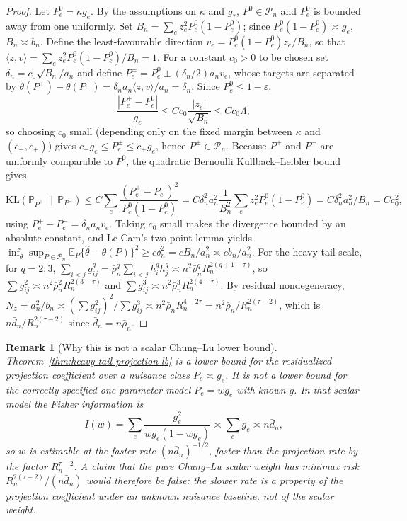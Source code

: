 \documentclass[12pt]{article}
\newtheorem{remark}{Remark}
\newcommand{\1}{\mathbf{1}}
\begin{document}
\begin{proof}
Let $P^0_e=\kappa g_e$. By the assumptions on $\kappa$ and $g_*$, $P^0\in\mathcal P_n$ and $P^0_e$ is
bounded away from one uniformly. Set $B_n=\sum_e z_e^2 P^0_e(1-P^0_e)$; since $P^0_e(1-P^0_e)\asymp g_e$,
$B_n\asymp b_n$. Define the least-favourable direction $v_e=P^0_e(1-P^0_e)z_e/B_n$, so that
$\langle z,v\rangle=\sum_e z_e^2 P^0_e(1-P^0_e)/B_n=1$. For a constant $c_0>0$ to be chosen set
$\delta_n=c_0\sqrt{B_n}/a_n$ and define $P^\pm_e=P^0_e\pm(\delta_n/2)a_n v_e$, whose targets are separated
by $\theta(P^+)-\theta(P^-)=\delta_n a_n\langle z,v\rangle/a_n=\delta_n$. Since $P^0_e\le 1-\varepsilon$,
\[
    \frac{|P^\pm_e-P^0_e|}{g_e}\le Cc_0\frac{|z_e|}{\sqrt{B_n}}\le Cc_0\Lambda,
\]
so choosing $c_0$ small (depending only on the fixed margin between $\kappa$ and $(c_-,c_+)$) gives
$c_-g_e\le P^\pm_e\le c_+g_e$, hence $P^\pm\in\mathcal P_n$. Because $P^+$ and $P^-$ are uniformly
comparable to $P^0$, the quadratic Bernoulli Kullback--Leibler bound gives
\[
    \mathrm{KL}(\mathbb P_{P^+}\,\|\,\mathbb P_{P^-})\le C\sum_e\frac{(P^+_e-P^-_e)^2}{P^0_e(1-P^0_e)}
    =C\delta_n^2 a_n^2\frac{1}{B_n^2}\sum_e z_e^2 P^0_e(1-P^0_e)=C\delta_n^2 a_n^2/B_n=Cc_0^2,
\]
using $P^+_e-P^-_e=\delta_n a_n v_e$. Taking $c_0$ small makes the divergence bounded by an absolute
constant, and Le Cam's two-point lemma yields
$\inf_{\widehat\theta}\sup_{P\in\mathcal P_n}\mathbb E_P\{\widehat\theta-\theta(P)\}^2\ge c\delta_n^2
=cB_n/a_n^2\asymp cb_n/a_n^2$. For the heavy-tail scale, for $q=2,3$,
$\sum_{i<j}g_{ij}^q=\bar\rho_n^q\sum_{i<j}h_i^q h_j^q\asymp n^2\bar\rho_n^q R_n^{2(q+1-\tau)}$, so
$\sum g_{ij}^2\asymp n^2\bar\rho_n^2 R_n^{2(3-\tau)}$ and $\sum g_{ij}^3\asymp n^2\bar\rho_n^3
R_n^{2(4-\tau)}$. By residual nondegeneracy,
$N_z=a_n^2/b_n\asymp(\sum g_{ij}^2)^2/\sum g_{ij}^3\asymp n^2\bar\rho_n R_n^{4-2\tau}
=n^2\bar\rho_n/R_n^{2(\tau-2)}$, which is $n\bar d_n/R_n^{2(\tau-2)}$ since $\bar d_n=n\bar\rho_n$.
\end{proof}

\begin{remark}[Why this is not a scalar Chung--Lu lower bound]
Theorem~\ref{thm:heavy-tail-projection-lb} is a lower bound for the residualized projection coefficient
over a nuisance class $P_e\asymp g_e$. It is not a lower bound for the correctly specified one-parameter
model $P_e=w g_e$ with known $g$. In that scalar model the Fisher information is
\[
    I(w)=\sum_e\frac{g_e^2}{wg_e(1-wg_e)}\asymp\sum_e g_e\asymp n\bar d_n,
\]
so $w$ is estimable at the faster rate $(n\bar d_n)^{-1/2}$, faster than the projection rate by the factor
$R_n^{\tau-2}$. A claim that the pure Chung--Lu scalar weight has minimax risk $R_n^{2(\tau-2)}/(n\bar d_n)$
would therefore be false: the slower rate is a property of the projection coefficient under an unknown
nuisance baseline, not of the scalar weight.
\end{remark}
\end{document}
